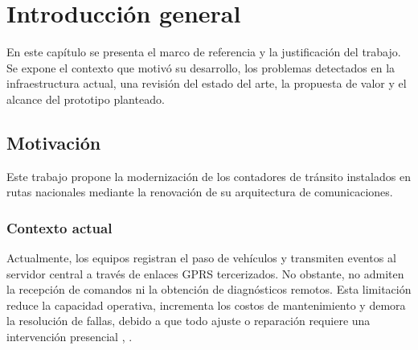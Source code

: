 
\chapter{Introducción general} %

\label{Chapter1} %
\label{IntroGeneral}


\newcommand{\keyword}[1]{\textbf{#1}}
\newcommand{\tabhead}[1]{\textbf{#1}}
\newcommand{\code}[1]{\texttt{#1}}
\newcommand{\file}[1]{\texttt{\bfseries#1}}
\newcommand{\option}[1]{\texttt{\itshape#1}}
\newcommand{\grados}{$^{\circ}$}

En este capítulo se presenta el marco de referencia y la justificación del trabajo. Se expone el contexto que motivó su desarrollo, los problemas detectados en la infraestructura actual, una revisión del estado del arte, la propuesta de valor y el alcance del prototipo planteado.





\section{Motivación}

Este trabajo propone la modernización de los contadores de tránsito instalados en rutas nacionales mediante la renovación de su arquitectura de comunicaciones. 
\subsection{Contexto actual}
Actualmente, los equipos registran el paso de vehículos y transmiten eventos al servidor central a través de enlaces GPRS tercerizados. No obstante, no admiten la recepción de comandos ni la obtención de diagnósticos remotos. Esta limitación reduce la capacidad operativa, incrementa los costos de mantenimiento y demora la resolución de fallas, debido a que todo ajuste o reparación requiere una intervención presencial \cite{asiain2021lora} , \cite{micko2023iot}.
